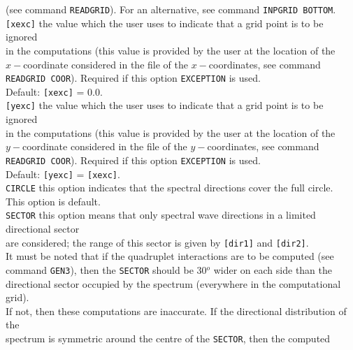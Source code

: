 \documentclass[12pt]{book}
\begin{document}
\begin{tabbing}
                     (see command {\tt READGRID}). For an alternative, see command {\tt INPGRID BOTTOM}.\-\\
{\tt [xexc]}      \> the value which the user uses to indicate that a grid point is to be ignored\+\\
                     in the computations (this value is provided by the user at the location of the\\
                     $x-$coordinate considered in the file of the $x-$coordinates, see command\\
                     {\tt READGRID COOR}). Required if this option {\tt EXCEPTION} is used.\\
                     Default: {\tt [xexc]} = 0.0.\-\\
{\tt [yexc]}      \> the value which the user uses to indicate that a grid point is to be ignored\+\\
                     in the computations (this value is provided by the user at the location of the\\
                     $y-$coordinate considered in the file of the $y-$coordinates, see command\\
                     {\tt READGRID COOR}). Required if this option {\tt EXCEPTION} is used.\\
                     Default: {\tt [yexc]} = {\tt [xexc]}.\-\\
{\tt CIRCLE}      \> this option indicates that the spectral directions cover the full circle.\+\\
                     This option is default.\-\\
{\tt SECTOR}      \> this option means that only spectral wave directions in a limited directional sector\+\\
                     are considered; the range of this sector is given by {\tt [dir1]} and {\tt [dir2]}.\-\\
                  \> It must be noted that if the quadruplet interactions are to be computed (see\+\\
                     command {\tt GEN3}), then the {\tt SECTOR} should be 30$^o$ wider on each side than the\\
                     directional sector occupied by the spectrum (everywhere in the computational grid).\\
                     If not, then these computations are inaccurate. If the directional distribution of the\\
                     spectrum is symmetric around the centre of the {\tt SECTOR}, then the computed\\

\end{tabbing}
\end{document}
